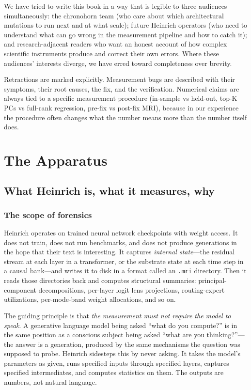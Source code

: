 \documentclass[11pt,openany]{book}
\begin{document}
We have tried to write this book in a way that is legible to three
audiences simultaneously: the chronohorn team (who care about which
architectural mutations to run next and at what scale); future
Heinrich operators (who need to understand what can go wrong in the
measurement pipeline and how to catch it); and research-adjacent
readers who want an honest account of how complex scientific
instruments produce and correct their own errors. Where these
audiences' interests diverge, we have erred toward completeness over
brevity.

Retractions are marked explicitly. Measurement bugs are described
with their symptoms, their root causes, the fix, and the verification.
Numerical claims are always tied to a specific measurement procedure
(in-sample vs held-out, top-K PCs vs full-rank regression, pre-fix vs
post-fix MRI), because in our experience the procedure often changes
what the number means more than the number itself does.

\mainmatter

\part{The Apparatus}

\chapter{What Heinrich is, what it measures, why}

\section{The scope of forensics}

Heinrich operates on trained neural network checkpoints with weight
access. It does not train, does not run benchmarks, and does not
produce generations in the hope that their text is interesting. It
captures \emph{internal state}---the residual stream at each layer in
a transformer, or the substrate state at each time step in a
causal bank---and writes it to disk in a format called an \texttt{.mri}
directory. Then it reads those directories back and computes
structural summaries: principal-component decompositions, per-layer
logit lens projections, routing-expert utilizations, per-mode-band
weight allocations, and so on.

The guiding principle is that \emph{the measurement must not require
the model to speak}. A generative language model being asked ``what
do you compute?'' is in the same position as a conscious subject
being asked ``what are you thinking?''---the answer is a generation,
produced by the same mechanisms the question was supposed to probe.
Heinrich sidesteps this by never asking. It takes the model's
parameters as given, runs specified inputs through specified layers,
captures specified intermediates, and computes statistics on them.
The outputs are numbers, not natural language.
\end{document}
